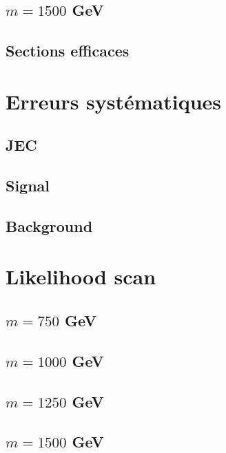 \documentclass[twoside,12pt]{article}
\begin{document}
\subsection{$m = 1500$ GeV}


\subsection{Sections efficaces}


\section{Erreurs systématiques}
\subsection{JEC}

\subsection{Signal}

\subsection{Background}

\section{Likelihood scan}

\subsection{$m = 750$ GeV}


\subsection{$m = 1000$ GeV}


\subsection{$m = 1250$ GeV}


\subsection{$m = 1500$ GeV}

\end{document}
